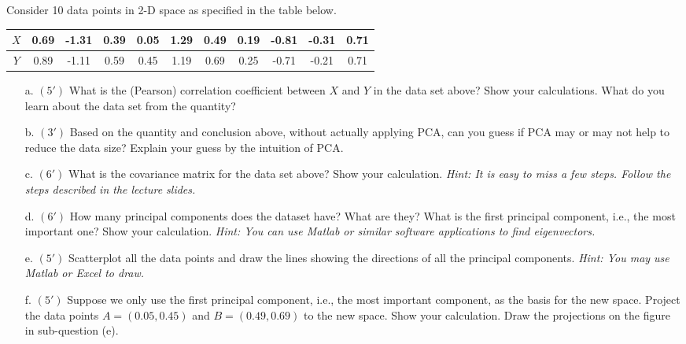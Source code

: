Consider 10 data points in 2-D space as specified in the table below. 
\begin{table}[htb]
\begin{center}
\begin{tabular}{|c|c|c|c|c|c|c|c|c|c|c|} \hline
 $X$ & 0.69 & -1.31 & 0.39 & 0.05 & 1.29 & 0.49 & 0.19 & -0.81 & -0.31 & 0.71  \\ \hline 
 $Y$ & 0.89 & -1.11 & 0.59 & 0.45 & 1.19 & 0.69 & 0.25 & -0.71 & -0.21 & 0.71  \\ \hline
\end{tabular}
\end{center}
\end{table}
\begin{enumerate}
  \item[a.] $(5')$ What is the (Pearson) correlation coefficient between $X$ and $Y$ in the data set above? Show your calculations. What do you learn about the data set from the quantity? 

  \item[b.] $(3')$ Based on the quantity and conclusion above, without actually applying PCA, can you guess if PCA may or may not help to reduce the data size? Explain your guess by the intuition of PCA.

  \item[c.] $(6')$ What is the covariance matrix for the data set above? Show your calculation. \textit{Hint: It is easy to miss a few steps. Follow the steps described in the lecture slides.}
  
  \item[d.] $(6')$ How many principal components does the dataset have? What are they? What is the first principal component, i.e., the most important one? Show your calculation. \textit{Hint: You can use Matlab or similar software applications to find eigenvectors.}
  
  \item[e.] $(5')$ Scatterplot all the data points and draw the lines showing the directions of all the principal components. \textit{Hint: You may use Matlab or Excel to draw.}
  
  \item[f.] $(5')$ Suppose we only use the first principal component, i.e., the most important component, as the basis for the new space. Project the data points $A=(0.05, 0.45)$ and $B=(0.49, 0.69)$ to the new space. Show your calculation. Draw the projections on the figure in sub-question (e).
  

\end{enumerate}



